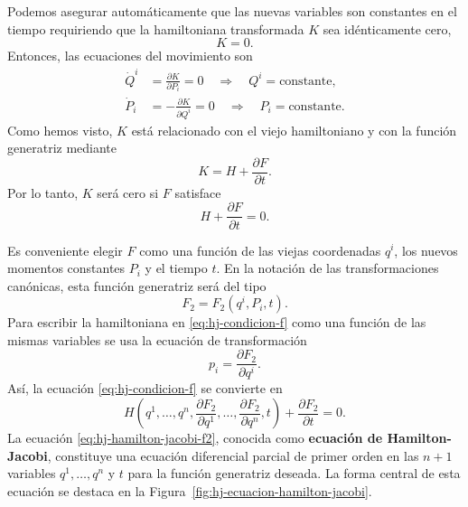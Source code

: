 \documentclass[../apunte_mecanica_clasica.tex]{subfiles}%
\begin{document}
Podemos asegurar automáticamente que las nuevas variables son constantes en el tiempo requiriendo que la hamiltoniana transformada $K$ sea idénticamente cero,
\begin{equation}
    K=0.
    \label{eq:hj-k-cero}
\end{equation}
Entonces, las ecuaciones del movimiento son
\begin{align}
    \dot Q^i &= \frac{\partial K}{\partial P_i}=0
    \quad \Rightarrow \quad Q^i=\text{constante},
    \label{eq:hj-q-constante}\\
    \dot P_i &= -\frac{\partial K}{\partial Q^i}=0
    \quad \Rightarrow \quad P_i=\text{constante}.
    \label{eq:hj-p-constante}
\end{align}
Como hemos visto, $K$ está relacionado con el viejo hamiltoniano y con la función generatriz mediante
\begin{equation}
    K=H+\frac{\partial F}{\partial t}.
    \label{eq:hj-k-h-f}
\end{equation}
Por lo tanto, $K$ será cero si $F$ satisface
\begin{equation}
    H+\frac{\partial F}{\partial t}=0.
    \label{eq:hj-condicion-f}
\end{equation}

Es conveniente elegir $F$ como una función de las viejas coordenadas $q^i$, los nuevos momentos constantes $P_i$ y el tiempo $t$. En la notación de las transformaciones canónicas, esta función generatriz será del tipo
\begin{equation}
    F_2=F_2(q^i,P_i,t).
    \label{eq:hj-f2}
\end{equation}
Para escribir la hamiltoniana en \eqref{eq:hj-condicion-f} como una función de las mismas variables se usa la ecuación de transformación
\begin{equation}
    p_i=\frac{\partial F_2}{\partial q^i}.
    \label{eq:hj-p-f2}
\end{equation}
Así, la ecuación \eqref{eq:hj-condicion-f} se convierte en
\begin{equation}
    H\left(q^1,\dots,q^n,
    \frac{\partial F_2}{\partial q^1},\dots,
    \frac{\partial F_2}{\partial q^n},t\right)
    +\frac{\partial F_2}{\partial t}=0.
    \label{eq:hj-hamilton-jacobi-f2}
\end{equation}
La ecuación \eqref{eq:hj-hamilton-jacobi-f2}, conocida como \textbf{ecuación de Hamilton-Jacobi}, constituye una ecuación diferencial parcial de primer orden en las $n+1$ variables $q^1,
\dots,q^n$ y $t$ para la función generatriz deseada. La forma central de esta ecuación se destaca en la Figura~\ref{fig:hj-ecuacion-hamilton-jacobi}.
\end{document}
